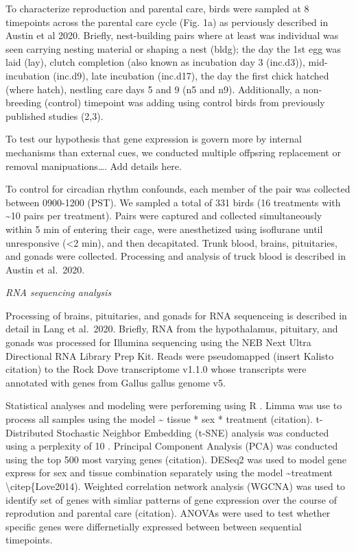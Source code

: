 To characterize reproduction and parental care, birds were sampled at 8
timepoints across the parental care cycle (Fig. 1a) as perviously
described in Austin et al 2020. Briefly, nest-building pairs where at
least was individual was seen carrying nesting material or shaping a
nest (bldg); the day the 1st egg was laid (lay), clutch completion (also
known as incubation day 3 (inc.d3)), mid-incubation (inc.d9), late
incubation (inc.d17), the day the first chick hatched (where hatch),
nestling care days 5 and 9 (n5 and n9). Additionally, a non-breeding
(control) timepoint was adding using control birds from previously
published studies (2,3).

To test our hypothesis that gene expression is govern more by internal
mechanisms than external cues, we conducted multiple offpsring
replacement or removal manipuations\ldots{}. Add details here.

To control for circadian rhythm confounds, each member of the pair was
collected between 0900-1200 (PST). We sampled a total of 331 birds (16
treatments with \textasciitilde{}10 pairs per treatment). Pairs were
captured and collected simultaneously within 5 min of entering their
cage, were anesthetized using isoflurane until unresponsive
(\textless{}2 min), and then decapitated. Trunk blood, brains,
pituitaries, and gonads were collected. Processing and analysis of truck
blood is described in Austin et al.~2020.

\emph{RNA sequencing analysis}

Processing of brains, pituitaries, and gonads for RNA sequenceing is
described in detail in Lang et al.~2020. Briefly, RNA from the
hypothalamus, pituitary, and gonads was processed for Illumina
sequencing using the NEB Next Ultra Directional RNA Library Prep Kit.
Reads were pseudomapped (insert Kalisto citation) to the Rock Dove
transcriptome v1.1.0 whose transcripts were annotated with genes from
Gallus gallus genome v5.

Statistical analyses and modeling were perforeming using R
\citep{RDevelopmentCoreTeam2013, Wickham2016}. Limma was use to process
all samples using the model \textasciitilde{} tissue * sex * treatment
(citation). t-Distributed Stochastic Neighbor Embedding (t-SNE) analysis
was conducted using a perplexity of 10 \citep{VanDerMaaten2008}.
Principal Component Analysis (PCA) was conducted using the top 500 most
varying genes (citation). DESeq2 was used to model gene express for sex
and tissue combination separately using the model
\textasciitilde{}treatment \textbackslash{}citep\{Love2014). Weighted
correlation network analysis (WGCNA) was used to identify set of genes
with simliar patterns of gene expression over the course of reprodution
and parental care (citation). ANOVAs were used to test whether specific
genes were differnetially expressed between between sequential
timepoints.

